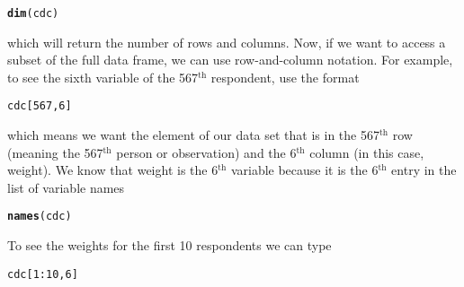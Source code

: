 \documentclass{article}\usepackage[]{graphicx}\usepackage[]{color}
\makeatletter
\newcommand{\hlnum}[1]{\textcolor[rgb]{0.686,0.059,0.569}{#1}}%
\newcommand{\hlopt}[1]{\textcolor[rgb]{0,0,0}{#1}}%
\newcommand{\hlstd}[1]{\textcolor[rgb]{0.345,0.345,0.345}{#1}}%
\newcommand{\hlkwd}[1]{\textcolor[rgb]{0.737,0.353,0.396}{\textbf{#1}}}%
\newenvironment{kframe}{%
 \def\at@end@of@kframe{}%
 \ifinner\ifhmode%
  \def\at@end@of@kframe{\end{minipage}}%
  \begin{minipage}{\columnwidth}%
 \fi\fi%
 \def\FrameCommand##1{\hskip\@totalleftmargin \hskip-\fboxsep
 \colorbox{shadecolor}{##1}\hskip-\fboxsep
     \hskip-\linewidth \hskip-\@totalleftmargin \hskip\columnwidth}%
 \MakeFramed {\advance\hsize-\width
   \@totalleftmargin\z@ \linewidth\hsize
   \@setminipage}}%
 {\par\unskip\endMakeFramed%
 \at@end@of@kframe}
\newenvironment{knitrout}{}{} %
\makeatother
\begin{document}
\begin{knitrout}
\color{fgcolor}\begin{kframe}
\begin{alltt}
\hlkwd{dim}\hlstd{(cdc)}
\end{alltt}
\end{kframe}
\end{knitrout}


which will return the number of rows and columns. Now, if we want to access a subset of the full data frame, we can use row-and-column notation. For example, to see the sixth variable of the 567$^{\textrm{th}}$ respondent, use the format

\begin{knitrout}
\color{fgcolor}\begin{kframe}
\begin{alltt}
\hlstd{cdc[}\hlnum{567}\hlstd{,} \hlnum{6}\hlstd{]}
\end{alltt}
\end{kframe}
\end{knitrout}


which means we want the element of our data set that is in the 567$^{\textrm{th}}$ row (meaning the 567$^{\textrm{th}}$ person or observation) and the 6$^{\textrm{th}}$ column (in this case, weight). We know that \hlstd{weight} is the 6$^{\textrm{th}}$ variable because it is the 6$^{\textrm{th}}$ entry in the list of variable names

\begin{knitrout}
\color{fgcolor}\begin{kframe}
\begin{alltt}
\hlkwd{names}\hlstd{(cdc)}
\end{alltt}
\end{kframe}
\end{knitrout}


To see the weights for the first 10 respondents we can type

\begin{knitrout}
\color{fgcolor}\begin{kframe}
\begin{alltt}
\hlstd{cdc[}\hlnum{1}\hlopt{:}\hlnum{10}\hlstd{,} \hlnum{6}\hlstd{]}
\end{alltt}
\end{kframe}
\end{knitrout}
\end{document}
